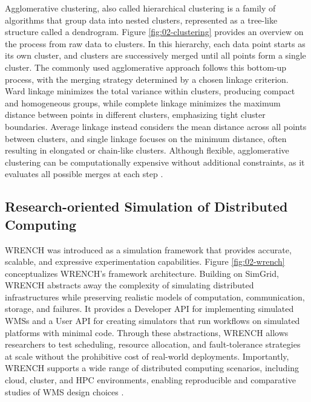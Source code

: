 Agglomerative clustering, also called hierarchical clustering is a family of algorithms that group data into nested clusters, represented as a tree-like structure called a dendrogram. Figure \ref{fig:02-clustering} provides an overview on the process from raw data to clusters. In this hierarchy, each data point starts as its own cluster, and clusters are successively merged until all points form a single cluster. The commonly used agglomerative approach follows this bottom-up process, with the merging strategy determined by a chosen linkage criterion. Ward linkage minimizes the total variance within clusters, producing compact and homogeneous groups, while complete linkage minimizes the maximum distance between points in different clusters, emphasizing tight cluster boundaries. Average linkage instead considers the mean distance across all points between clusters, and single linkage focuses on the minimum distance, often resulting in elongated or chain-like clusters. Although flexible, agglomerative clustering can be computationally expensive without additional constraints, as it evaluates all possible merges at each step \cite{scikit_clustering_2025}.

\subsection{Research-oriented Simulation of Distributed Computing}
\label{sec:background_simulation}

WRENCH was introduced as a simulation framework that provides accurate, scalable, and expressive experimentation capabilities. Figure \ref{fig:02-wrench} conceptualizes WRENCH's framework architecture. Building on SimGrid, WRENCH abstracts away the complexity of simulating distributed infrastructures while preserving realistic models of computation, communication, storage, and failures. It provides a Developer API for implementing simulated WMSs and a User API for creating simulators that run workflows on simulated platforms with minimal code. Through these abstractions, WRENCH allows researchers to test scheduling, resource allocation, and fault-tolerance strategies at scale without the prohibitive cost of real-world deployments. Importantly, WRENCH supports a wide range of distributed computing scenarios, including cloud, cluster, and HPC environments, enabling reproducible and comparative studies of WMS design choices \cite{wrench}.

